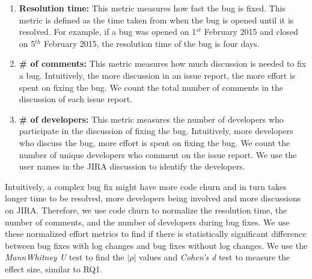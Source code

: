 \begin{enumerate}
	\item \textbf{Resolution time:} This metric measures how fast the bug is fixed. This metric is defined as the time taken from when the bug is opened until it is resolved. For example, if a bug was opened on 1$ ^{st}$ February 2015 and closed on 5$ ^{th}$ February 2015, the resolution time of the bug is four days. 
	
	\item \textbf {\# of comments:} This metric measures how much discussion is needed to fix a bug. Intuitively, the more discussion in an issue report, the more effort is spent on fixing the bug. We count the total number of comments in the discussion of each issue report.
	
	\item \textbf {\# of developers:} This metric measures the number of developers who participate in the discussion of fixing the bug. Intuitively, more developers who discuss the bug, more effort is spent on fixing the bug. We count the number of unique developers who comment on the issue report. We use the user names in the JIRA discussion to identify the developers. 
\end{enumerate}
Intuitively, a complex bug fix might have more code churn and in turn takes longer time to be resolved, more developers being involved and more discussions on JIRA. Therefore, we use code churn to normalize the resolution time, the number of comments, and the number of developers during bug fixes. We use these normalized effort metrics to find if there is statistically significant difference between bug fixes with log changes and bug fixes without log changes. We use the {\em MannWhitney U} test to find the $|\rho|$ values and \textsl{Cohen's d} test to measure the effect size, similar to RQ1. 







